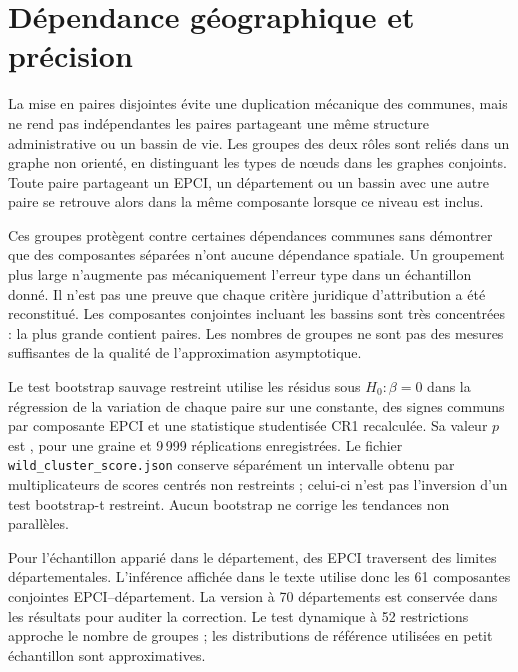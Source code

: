 \section{Dépendance géographique et précision}
La mise en paires disjointes évite une duplication mécanique des communes, mais ne rend pas indépendantes les paires partageant une même structure administrative ou un bassin de vie. Les groupes des deux rôles sont reliés dans un graphe non orienté, en distinguant les types de nœuds dans les graphes conjoints. Toute paire partageant un EPCI, un département ou un bassin avec une autre paire se retrouve alors dans la même composante lorsque ce niveau est inclus.

Ces groupes protègent contre certaines dépendances communes sans démontrer que des composantes séparées n’ont aucune dépendance spatiale. Un groupement plus large n’augmente pas mécaniquement l’erreur type dans un échantillon donné. Il n’est pas une preuve que chaque critère juridique d’attribution a été reconstitué. Les \EDBComponentsN{} composantes conjointes incluant les bassins sont très concentrées : la plus grande contient \EDBMaxPairsN{} paires. Les nombres de groupes ne sont pas des mesures suffisantes de la qualité de l’approximation asymptotique.

\begin{table}[htbp]\centering\small\caption{Sensibilité des erreurs types du contraste principal}\end{table}

Le test bootstrap sauvage restreint utilise les résidus sous $H_0:\beta=0$ dans la régression de la variation de chaque paire sur une constante, des signes communs par composante EPCI et une statistique studentisée CR1 recalculée. Sa valeur $p$ est \WildP{}, pour une graine et 9\,999 réplications enregistrées. Le fichier \texttt{wild\_cluster\_score.json} conserve séparément un intervalle obtenu par multiplicateurs de scores centrés non restreints ; celui-ci n’est pas l’inversion d’un test bootstrap-t restreint. Aucun bootstrap ne corrige les tendances non parallèles.

Pour l’échantillon apparié dans le département, des EPCI traversent des limites départementales. L’inférence affichée dans le texte utilise donc les 61 composantes conjointes EPCI–département. La version à 70 départements est conservée dans les résultats pour auditer la correction. Le test dynamique à 52 restrictions approche le nombre de groupes ; les distributions de référence utilisées en petit échantillon sont approximatives.

